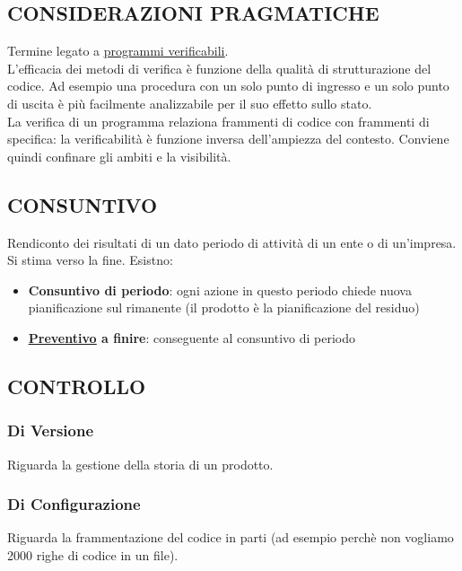 		\subsection{CONSIDERAZIONI PRAGMATICHE} 	\label{pragmatico}
		Termine legato a \underline{\hyperref[programmiverificabili]{programmi verificabili}}. \\
		L’efficacia dei metodi di verifica è funzione della qualità di strutturazione del codice. Ad esempio una procedura con un solo punto di ingresso e un solo punto di uscita è più facilmente analizzabile per il suo effetto sullo stato. \\
		La verifica di un programma relaziona frammenti di codice con frammenti di specifica: la verificabilità è funzione inversa dell’ampiezza del contesto. Conviene quindi confinare gli ambiti e la visibilità.


		\subsection{CONSUNTIVO}  \label{consuntivo}
		Rendiconto dei risultati di un dato periodo di attività di un ente o di un'impresa. Si stima verso la fine.
		Esistno:
			\begin{itemize}
				\item \textbf{Consuntivo di periodo}: ogni azione in questo periodo chiede nuova pianificazione sul rimanente (il prodotto è la pianificazione del residuo)
				\item \textbf{\underline{\hyperref[preventivo]{Preventivo}} a finire}: conseguente al consuntivo di periodo
			\end{itemize}


		\subsection{CONTROLLO}  \label{controllo}
			\subsubsection{Di Versione}  \label{controllodiversione} 
			Riguarda la gestione della storia di un prodotto.
			\subsubsection{Di Configurazione}  \label{controllodiconfigurazione} 
			Riguarda la frammentazione del codice in parti (ad esempio perchè non vogliamo 2000 righe di codice in un file).


